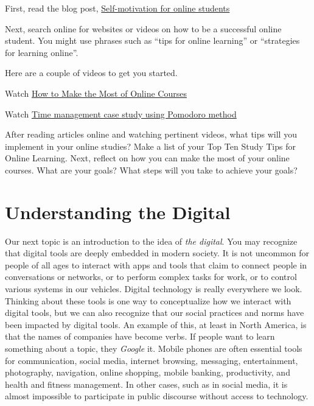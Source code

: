 \documentclass[
]{book}
\theoremstyle{definition}
\theoremstyle{definition}
\theoremstyle{definition}
\theoremstyle{definition}
\theoremstyle{remark}
\begin{document}
\begin{reflect}
First, read the blog post, \href{https://www.purdueglobal.edu/blog/online-learning/online-learning-self-motivation/}{Self-motivation for online students}

Next, search online for websites or videos on how to be a successful online student. You might use phrases such as ``tips for online learning'' or ``strategies for learning online''.

Here are a couple of videos to get you started.

Watch \href{https://www.youtube.com/watch?v=eF-Z1hJ67-Y}{How to Make the Most of Online Courses}

Watch \href{https://www.youtube.com/watch?v=z7e7gtU3PHY}{Time management case study using Pomodoro method}

After reading articles online and watching pertinent videos, what tips will you implement in your online studies?
Make a list of your Top Ten Study Tips for Online Learning. Next, reflect on how you can make the most of your online courses. What are your goals? What steps will you take to achieve your goals?
\end{reflect}

\hypertarget{understanding-the-digital}{%
\section{Understanding the Digital}\label{understanding-the-digital}}

Our next topic is an introduction to the idea of \emph{the digital}. You may recognize that digital tools are deeply embedded in modern society. It is not uncommon for people of all ages to interact with apps and tools that claim to connect people in conversations or networks, or to perform complex tasks for work, or to control various systems in our vehicles. Digital technology is really everywhere we look. Thinking about these tools is one way to conceptualize how we interact with digital tools, but we can also recognize that our social practices and norms have been impacted by digital tools. An example of this, at least in North America, is that the names of companies have become verbs. If people want to learn something about a topic, they \emph{Google} it. Mobile phones are often essential tools for communication, social media, internet browsing, messaging, entertainment, photography, navigation, online shopping, mobile banking, productivity, and health and fitness management. In other cases, such as in social media, it is almost impossible to participate in public discourse without access to technology.
\end{document}
